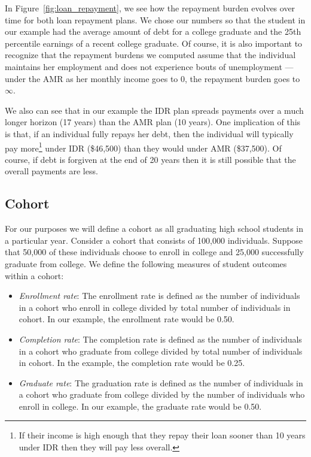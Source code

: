   In Figure~\ref{fig:loan_repayment}, we see how the repayment burden evolves over time for both
  loan repayment plans. We chose our numbers so that the student in our example had the average
  amount of debt for a college graduate and the 25th percentile earnings of a recent college
  graduate. Of course, it is also important to recognize that the repayment burdens we computed
  assume that the individual maintains her employment and does not experience bouts of unemployment
  --- under the AMR as her monthly income goes to 0, the repayment burden goes to $\infty$.

  We also can see that in our example the IDR plan spreads payments over a much longer horizon (17
  years) than the AMR plan (10 years). One implication of this is that, if an individual fully
  repays her debt, then the individual will typically pay more\footnote{If their income is high
  enough that they repay their loan sooner than 10 years under IDR then they will pay less overall.}
  under IDR (\$46,500) than they would under AMR (\$37,500). Of course, if debt is forgiven at the
  end of 20 years then it is still possible that the overall payments are less.


\subsection{Cohort} \label{subsec:cohort}

  For our purposes we will define a cohort as all graduating high school students in a particular
  year. Consider a cohort that consists of 100,000 individuals. Suppose that 50,000 of these
  individuals choose to enroll in college and 25,000 successfully graduate from college. We define
  the following measures of student outcomes within a cohort:

  \begin{itemize}
    \item \textit{Enrollment rate}: The enrollment rate is defined as the number of individuals in
          a cohort who enroll in college divided by total number of individuals in cohort. In our
          example, the enrollment rate would be 0.50.
    \item \textit{Completion rate}: The completion rate is defined as the number of individuals in
          a cohort who graduate from college divided by total number of individuals in cohort. In
          the example, the completion rate would be 0.25.
    \item \textit{Graduate rate}: The graduation rate is defined as the number of individuals in a
          cohort who graduate from college divided by the number of individuals who enroll in
          college. In our example, the graduate rate would be 0.50.
  \end{itemize}

